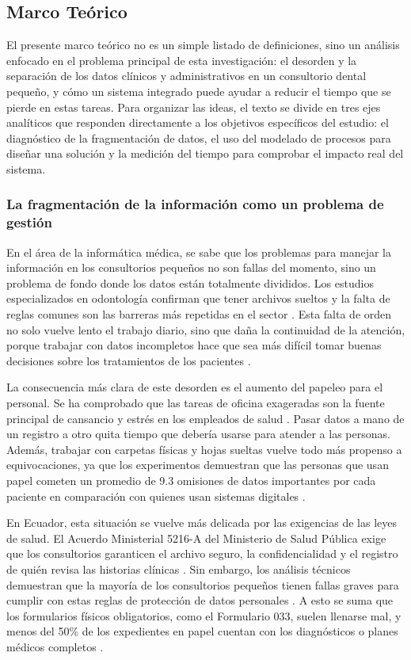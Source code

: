 \subsection{Marco Teórico}

El presente marco teórico no es un simple listado de definiciones, sino un análisis enfocado en el problema principal de esta investigación: el desorden y la separación de los datos clínicos y administrativos en un consultorio dental pequeño, y cómo un sistema integrado puede ayudar a reducir el tiempo que se pierde en estas tareas. Para organizar las ideas, el texto se divide en tres ejes analíticos que responden directamente a los objetivos específicos del estudio: el diagnóstico de la fragmentación de datos, el uso del modelado de procesos para diseñar una solución y la medición del tiempo para comprobar el impacto real del sistema.
\subsubsection{La fragmentación de la información como un problema de gestión}

En el área de la informática médica, se sabe que los problemas para manejar la información en los consultorios pequeños no son fallas del momento, sino un problema de fondo donde los datos están totalmente divididos. Los estudios especializados en odontología confirman que tener archivos sueltos y la falta de reglas comunes son las barreras más repetidas en el sector \cite{ballester2022current}. Esta falta de orden no solo vuelve lento el trabajo diario, sino que daña la continuidad de la atención, porque trabajar con datos incompletos hace que sea más difícil tomar buenas decisiones sobre los tratamientos de los pacientes \cite{gurupur2024need}.

La consecuencia más clara de este desorden es el aumento del papeleo para el personal. Se ha comprobado que las tareas de oficina exageradas son la fuente principal de cansancio y estrés en los empleados de salud \cite{murad2024measuring}. Pasar datos a mano de un registro a otro quita tiempo que debería usarse para atender a las personas. Además, trabajar con carpetas físicas y hojas sueltas vuelve todo más propenso a equivocaciones, ya que los experimentos demuestran que las personas que usan papel cometen un promedio de 9.3 omisiones de datos importantes por cada paciente en comparación con quienes usan sistemas digitales \cite{pmc2024digital}.

En Ecuador, esta situación se vuelve más delicada por las exigencias de las leyes de salud. El Acuerdo Ministerial 5216-A del Ministerio de Salud Pública exige que los consultorios garanticen el archivo seguro, la confidencialidad y el registro de quién revisa las historias clínicas \cite{msp2016reglamento}. Sin embargo, los análisis técnicos demuestran que la mayoría de los consultorios pequeños tienen fallas graves para cumplir con estas reglas de protección de datos personales \cite{martinez2022proteccion}. A esto se suma que los formularios físicos obligatorios, como el Formulario 033, suelen llenarse mal, y menos del 50\% de los expedientes en papel cuentan con los diagnósticos o planes médicos completos \cite{uce2016caracteristicas}.

